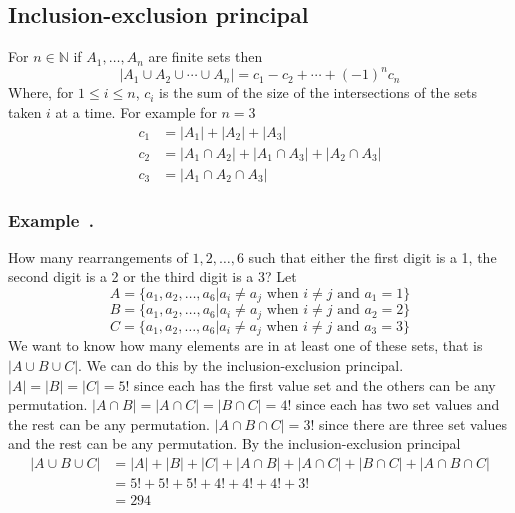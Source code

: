 \documentclass{article}
\newcommand{\bb}[1]{\mathbb{#1}}
\newcounter{example}[section]
\newenvironment{example}[1][]{\refstepcounter{example}\vspace{-0.2cm}
\subsubsection*{Example~\thesection.\theexample} \rmfamily}{\par}
\begin{document}
\subsection*{Inclusion-exclusion principal}

For \(n\in\bb N\) if \(A_1,\dotsc,A_n\) are finite sets then
\[|A_1\cup A_2\cup \dotsb \cup A_n|=c_1-c_2+\dotsb+(-1)^nc_n\]
Where, for \(1\le i\le n\), \(c_i\) is the sum of the size of the intersections of the sets taken \(i\) at a time. For example for \(n=3\)
\begin{align*}
c_1&=|A_1|+|A_2|+|A_3|\\
c_2&=|A_1\cap A_2|+|A_1\cap A_3|+|A_2\cap A_3|\\
c_3&=|A_1\cap A_2\cap A_3|
\end{align*}

\begin{example}
How many rearrangements of \(1,2,\dotsc,6\) such that either the first digit is a 1, the second digit is a 2 or the third digit is a 3? Let
\[A=\{a_1,a_2,\dotsc,a_6|a_i\ne a_j\text{ when }i\ne j\text{ and }a_1=1\}\]
\[B=\{a_1,a_2,\dotsc,a_6|a_i\ne a_j\text{ when }i\ne j\text{ and }a_2=2\}\]
\[C=\{a_1,a_2,\dotsc,a_6|a_i\ne a_j\text{ when }i\ne j\text{ and }a_3=3\}\]
We want to know how many elements are in at least one of these sets, that is \(|A\cup B\cup C|\). We can do this by the inclusion-exclusion principal. \(|A|=|B|=|C|=5!\) since each has the first value set and the others can be any permutation. \(|A\cap B|=|A\cap C|=|B\cap C|=4!\) since each has two set values and the rest can be any permutation. \(|A\cap B\cap C|=3!\) since there are three set values and the rest can be any permutation. By the inclusion-exclusion principal
\begin{align*}
|A\cup B\cup C|&=|A|+|B|+|C|+|A\cap B|+|A\cap C|+|B\cap C|+|A\cap B\cap C|\\
&=5!+5!+5!+4!+4!+4!+3!\\
&=294
\end{align*}
\end{example}
\end{document}
